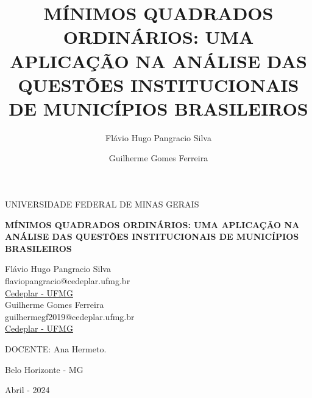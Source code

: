 \documentclass[a4paper,12pt]{article}
\title{MÍNIMOS QUADRADOS ORDINÁRIOS: UMA APLICAÇÃO NA ANÁLISE DAS
QUESTÕES INSTITUCIONAIS DE MUNICÍPIOS BRASILEIROS}
\author{Flávio Hugo Pangracio Silva \and Guilherme Gomes Ferreira}
\date{}
\renewcommand*\listfigurename{Lista de Figuras}
\newcommand\listfigurename{Lista de Figuras}
\renewcommand*\listtablename{Lista de Tabelas}
\newcommand\listtablename{Lista de Tabelas}
\begin{document}
\thispagestyle{empty}

\begin{center}
UNIVERSIDADE FEDERAL DE MINAS GERAIS
\end{center}


\vspace{3.5cm}

\begin{center}
    \textbf{MÍNIMOS QUADRADOS ORDINÁRIOS: UMA APLICAÇÃO NA ANÁLISE DAS
QUESTÕES INSTITUCIONAIS DE MUNICÍPIOS BRASILEIROS}
\end{center}

\vspace{3.5cm}
\hypersetup{
    urlcolor=black,
    linkcolor=black
}

\begin{center}
Flávio Hugo Pangracio
Silva~\\flaviopangracio@cedeplar.ufmg.br\\\href{https://cedeplar.ufmg.br}{Cedeplar
- UFMG}\\\vspace{1cm}Guilherme Gomes
Ferreira~\\guilhermegf2019@cedeplar.ufmg.br\\\href{https://cedeplar.ufmg.br}{Cedeplar
- UFMG}\\\vspace{1cm}
\end{center}


\vspace{3.5cm}

\begin{center}

DOCENTE: Ana Hermeto.
\end{center}

\vspace{3.5cm}

\begin{center}

Belo Horizonte - MG

Abril - 2024
    
\end{center}

\newpage

\renewcommand{\listfigurename}{LISTA DE FIGURAS}
\pagestyle{fancy}
\listoffigures

\newpage
\renewcommand{\listtablename}{LISTA DE TABELAS}
\pagestyle{fancy}
\listoftables
\end{document}
